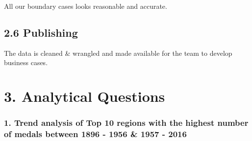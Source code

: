 \documentclass[
]{article}
\begin{document}
All our boundary cases looks reasonable and accurate.

\hypertarget{publishing}{%
\subsection{2.6 Publishing}\label{publishing}}

The data is cleaned \& wrangled and made available for the team to
develop business cases.

\hypertarget{analytical-questions}{%
\section{3. Analytical Questions}\label{analytical-questions}}

\hypertarget{trend-analysis-of-top-10-regions-with-the-highest-number-of-medals-between-1896---1956-1957---2016}{%
\subsubsection{1. Trend analysis of Top 10 regions with the highest
number of medals between 1896 - 1956 \& 1957 -
2016}\label{trend-analysis-of-top-10-regions-with-the-highest-number-of-medals-between-1896---1956-1957---2016}}
\end{document}
